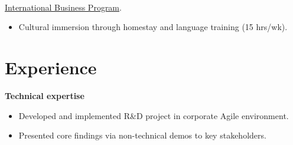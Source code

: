\documentclass[a4paper, margin]{res}
\begin{document}
\begin{sloppypar}
\begin{resume}
\begin{itemize}


\end{itemize}

\\
\href{http://www.disabroad.org/study-abroad/programs/business/}{International Business Program}.
\begin{itemize}
    \item Cultural immersion through homestay and language training (15 hrs/wk). 
\end{itemize}

\section{Experience}
\textbf{Technical expertise} \\
    \begin{itemize}
        \item Developed and implemented R\&D project in corporate Agile environment.
        \item Presented core findings via non-technical demos to key stakeholders.
    \end{itemize}


\end{resume}
\end{sloppypar}
\end{document}
